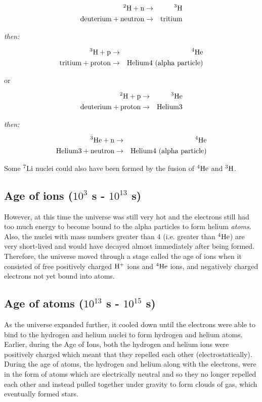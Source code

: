 \begin{eqnarray*}
^{2}\rm{H} + n & \rightarrow & ^{3}\rm{H} \\
\rm{deuterium} + \rm{neutron} & \rightarrow & \rm{tritium}
\end{eqnarray*}

\centerline{\emph{then:}}

\begin{eqnarray*}
^{3}\rm{H} + p & \rightarrow & ^{4}\rm{He} \\
\rm{tritium} + \rm{proton} & \rightarrow & \rm{Helium}\rm{4} \ \rm{(alpha} \ \rm{particle)}
\end{eqnarray*}

or

\begin{eqnarray*}
^{2}\rm{H} + p & \rightarrow & ^{3}\rm{He} \\
\rm{deuterium} + \rm{proton} & \rightarrow & \rm{Helium}\rm{3}
\end{eqnarray*}

\centerline{\emph{then:}}

\begin{eqnarray*}
^{3}\rm{He} + n & \rightarrow & ^{4}\rm{He} \\
\rm{Helium3} + \rm{neutron} & \rightarrow & \rm{Helium}\rm{4} \ \rm{(alpha} \ \rm{particle)}
\end{eqnarray*}

Some $^{7}\rm{Li}$ nuclei could also have been formed by the fusion of $^{4}\rm{He}$ and $^{3}\rm{H}$.

\subsection{Age of ions ($10^{3}$ s - $10^{13}$ s)}
However, at this time the universe was still very hot and the electrons still had too much energy to become bound to the alpha particles to form helium \emph{atoms}. Also, the nuclei with mass numbers greater than 4 (i.e.\@{} greater than $^{4}\rm{He}$) are very short-lived and would have decayed almost immediately after being formed. Therefore, the universe moved through a stage called the age of ions when it consisted of free positively charged $\rm{H}^{+}$ ions and $^{4}\rm{He}$ ions, and negatively charged electrons not yet bound into atoms.

\subsection{Age of atoms ($10^{13}$ s - $10^{15}$ s)}
As the universe expanded further, it cooled down until the electrons were able to bind to the hydrogen and helium nuclei to form hydrogen and helium atoms. Earlier, during the Age of Ions, both the hydrogen and helium ions were positively charged which meant that they repelled each other (electrostatically). During the age of atoms, the hydrogen and helium along with the electrons, were in the form of atoms which are electrically neutral and so they no longer repelled each other and instead pulled together under gravity to form clouds of gas, which eventually formed stars.

